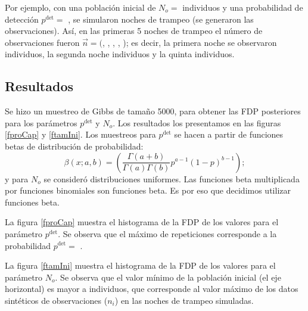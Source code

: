 \documentclass{article}
\begin{document}
Por ejemplo, con una poblaci\'on inicial de $N_o=$
individuos y una probabilidad de detecci\'on $p^{\mbox{det}}=$
, se simularon 
noches de trampeo (se generaron las observaciones).
As\'i, en las primeras 5 noches de trampeo el n\'umero de observaciones fueron
$\vec{n}=($, ,
, ,
); es decir,
la primera noche se observaron  individuos, la
segunda noche  individuos y la quinta
 individuos.

\subsection*{Resultados}
Se hizo un muestreo de Gibbs de tama\~no 5000, para obtener las FDP
posteriores para los par\'ametros $p^{\mbox{det}}$ y $N_o$. Los resultados
los presentamos en las figuras \ref{fproCap} y \ref{ftamIni}. Los muestreos para
$p^{\mbox{det}}$ se hacen a partir de funciones betas de distribuci\'on de
probabilidad:
$$\beta(x;a,b)=\left(\frac{\Gamma(a+b)}{\Gamma(a)\Gamma(b)}p^{a-1}(1-p)^{b-1}\right);$$
y para $N_o$ se consider\'o distribuciones uniformes. Las funciones beta
multiplicada por funciones binomiales son funciones beta. Es por eso que
decidimos utilizar funciones beta.


La figura \ref{fproCap} muestra el histograma de la FDP
de los valores para el par\'ametro $p^{\mbox{det}}$. Se observa que
el m\'aximo de repeticiones corresponde a la probabilidad $p^{\mbox{det}}=$
.


La figura \ref{ftamIni} muestra el histograma de la FDP
 de los valores para el par\'ametro $N_o$. Se observa que
el valor m\'inimo de la poblaci\'on inicial (el eje horizontal) es mayor a
 individuos, que corresponde al valor
m\'aximo de los datos sint\'eticos de observaciones ($n_i$) en las
 noches de trampeo simuladas.
\end{document}
